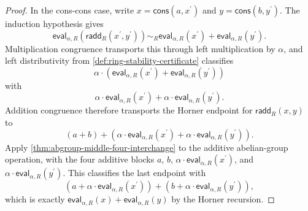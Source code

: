 \begin{proof}
In the cons-cons case, write $x=\mathsf{cons}(a,x^\prime)$ and $y=\mathsf{cons}(b,y^\prime)$. The induction hypothesis gives
$$
\mathsf{eval}_{\alpha,R}(\mathsf{radd}_R(x^\prime,y^\prime))\sim_R
\mathsf{eval}_{\alpha,R}(x^\prime)+\mathsf{eval}_{\alpha,R}(y^\prime).
$$
Multiplication congruence transports this through left multiplication by $\alpha$, and left distributivity from \autoref{def:ring-stability-certificate} classifies
$$
\alpha\cdot(\mathsf{eval}_{\alpha,R}(x^\prime)+\mathsf{eval}_{\alpha,R}(y^\prime))
$$
with
$$
\alpha\cdot\mathsf{eval}_{\alpha,R}(x^\prime)+\alpha\cdot\mathsf{eval}_{\alpha,R}(y^\prime).
$$
Addition congruence therefore transports the Horner endpoint for $\mathsf{radd}_R(x,y)$ to
$$
(a+b)+(\alpha\cdot\mathsf{eval}_{\alpha,R}(x^\prime)+\alpha\cdot\mathsf{eval}_{\alpha,R}(y^\prime)).
$$
Apply \autoref{thm:abgroup-middle-four-interchange} to the additive abelian-group operation, with the four additive blocks $a$, $b$, $\alpha\cdot\mathsf{eval}_{\alpha,R}(x^\prime)$, and $\alpha\cdot\mathsf{eval}_{\alpha,R}(y^\prime)$. This classifies the last endpoint with
$$
(a+\alpha\cdot\mathsf{eval}_{\alpha,R}(x^\prime))+(b+\alpha\cdot\mathsf{eval}_{\alpha,R}(y^\prime)),
$$
which is exactly $\mathsf{eval}_{\alpha,R}(x)+\mathsf{eval}_{\alpha,R}(y)$ by the Horner recursion.
\end{proof}

